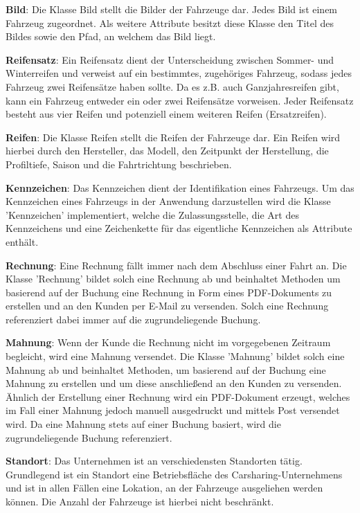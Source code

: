 \textbf{Bild}: Die Klasse Bild stellt die Bilder der Fahrzeuge dar. Jedes Bild ist einem Fahrzeug zugeordnet. Als weitere Attribute besitzt diese Klasse den Titel des Bildes sowie den Pfad, an welchem das Bild liegt.

\textbf{Reifensatz}: Ein Reifensatz dient der Unterscheidung zwischen Sommer- und Winterreifen und verweist auf ein bestimmtes, zugehöriges Fahrzeug, sodass jedes Fahrzeug zwei Reifensätze haben sollte. Da es z.B. auch Ganzjahresreifen gibt, kann ein Fahrzeug entweder ein oder zwei Reifensätze vorweisen.  
Jeder Reifensatz besteht aus vier Reifen und potenziell einem weiteren Reifen (Ersatzreifen).

\textbf{Reifen}: Die Klasse Reifen stellt die Reifen der Fahrzeuge dar. Ein Reifen wird hierbei durch den Hersteller, das Modell, den Zeitpunkt der Herstellung, die Profiltiefe, Saison und die Fahrtrichtung beschrieben.

\textbf{Kennzeichen}: Das Kennzeichen dient der Identifikation eines Fahrzeugs. Um das Kennzeichen eines Fahrzeugs in der Anwendung darzustellen wird die Klasse 'Kennzeichen' implementiert, welche die Zulassungsstelle, die Art des Kennzeichens und eine Zeichenkette für das eigentliche Kennzeichen als Attribute enthält.

\textbf{Rechnung}: Eine Rechnung fällt immer nach dem Abschluss einer Fahrt an. Die Klasse 'Rechnung' bildet solch eine Rechnung ab und beinhaltet Methoden um basierend auf der Buchung eine Rechnung in Form eines PDF-Dokuments zu erstellen und an den Kunden per E-Mail zu versenden. Solch eine Rechnung referenziert dabei immer auf die zugrundeliegende Buchung.

\textbf{Mahnung}: Wenn der Kunde die Rechnung nicht im vorgegebenen Zeitraum begleicht, wird eine Mahnung versendet. Die Klasse 'Mahnung' bildet solch eine Mahnung ab und beinhaltet Methoden, um basierend auf der Buchung eine Mahnung zu erstellen und um diese anschließend an den Kunden zu versenden. Ähnlich der Erstellung einer Rechnung wird ein PDF-Dokument erzeugt, welches im Fall einer Mahnung jedoch manuell ausgedruckt und mittels Post versendet wird. Da eine Mahnung stets auf einer Buchung basiert, wird die zugrundeliegende Buchung referenziert.

\textbf{Standort}: Das Unternehmen ist an verschiedensten Standorten tätig. Grundlegend ist ein Standort eine Betriebsfläche des Carsharing-Unternehmens und ist in allen Fällen eine Lokation, an der Fahrzeuge ausgeliehen werden können. Die Anzahl der Fahrzeuge ist hierbei nicht beschränkt.

